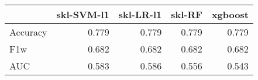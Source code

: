 \begin{tabular}{lrrrr}
\toprule
{} &  skl-SVM-l1 &  skl-LR-l1 &  skl-RF &  xgboost \\
\midrule
Accuracy &       0.779 &      0.779 &   0.779 &    0.779 \\
F1w      &       0.682 &      0.682 &   0.682 &    0.682 \\
AUC      &       0.583 &      0.586 &   0.556 &    0.543 \\
\bottomrule
\end{tabular}
